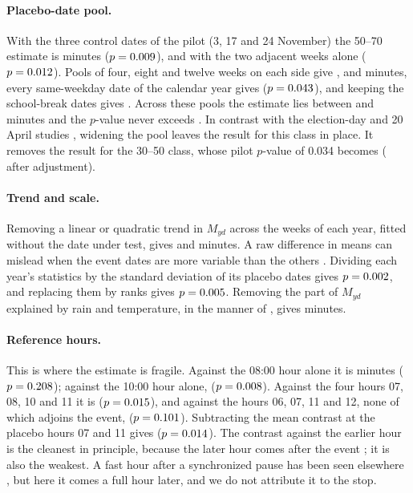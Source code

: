 \documentclass[11pt,a4paper]{article}
\newcommand{\Tab}[1]{\begin{center}\footnotesize\setlength{\tabcolsep}{4.5pt}\end{center}}
\begin{document}
\begin{table}[p]\centering
\caption{Robustness. Each row changes one feature of the main specification. Minutes are
full-stop-equivalent minutes; $p$-values are one-sided placebo-date $p$-values; ``Years $<0$'' counts
years with a negative estimate.}
\label{tab:rob}
\Tab{robustness}
\end{table}

\paragraph{Placebo-date pool.} With the three control dates of the pilot (3, 17 and 24 November)
the 50--70 estimate is \minRobPilot{} minutes ($p = 0.009$), and with the two adjacent weeks
alone \minRobAdjacent{} ($p = 0.012$). Pools of four, eight and twelve weeks on each side
give \minRobFour, \minFast{} and \minRobTwelve{} minutes, every same-weekday date of the calendar
year gives \minRobYear{} ($p = 0.043$), and keeping the school-break dates gives
\minRobBreak. Across these pools the estimate lies between \minPoolLo{} and \minPoolHi{} minutes
and the $p$-value never exceeds \pPoolMax. In contrast with the election-day and 20 April studies
\citep{zhang2016,harper2019}, widening the pool leaves the result for this class in place. It
removes the result for the 30--50 class, whose pilot $p$-value of 0.034 becomes \pMid{}
(\pMidStep{} after adjustment).

\paragraph{Trend and scale.} Removing a linear or quadratic trend in $M_{yd}$ across the weeks of
each year, fitted without the date under test, gives \minRobTrend{} and \minRobQuad{} minutes. A
raw difference in means can mislead when the event dates are more variable than the others
\citep{chung2013,wu2021}. Dividing each year's statistics by the standard deviation of its placebo
dates gives $p = 0.002$, and replacing them by ranks gives $p = 0.005$. Removing the part of
$M_{yd}$ explained by rain and temperature, in the manner of \citet{rosenbaum2002}, gives
\minRobRain{} minutes.

\paragraph{Reference hours.} This is where the estimate is fragile. Against the 08:00 hour alone
it is \minRobPre{} minutes ($p = 0.208$); against the 10:00 hour alone, \minRobPost{}
($p = 0.008$). Against the four hours 07, 08, 10 and 11 it is \minRobWide{} ($p = 0.015$),
and against the hours 06, 07, 11 and 12, none of which adjoins the event, \minRobFar{}
($p = 0.101$). Subtracting the mean contrast at the placebo hours 07 and 11 gives
\minRobNet{} ($p = 0.014$). The contrast against the earlier hour is the cleanest in principle,
because the later hour comes after the event \citep{rosenbaum2002book}; it is also the weakest.
A fast hour after a synchronized pause has been seen elsewhere \citep{meier2014,ngeni2022}, but
here it comes a full hour later, and we do not attribute it to the stop.
\end{document}
